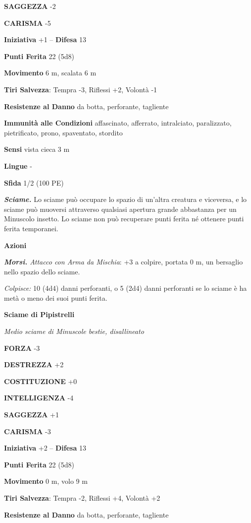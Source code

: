 \begin{multicols}{2}
\textbf{SAGGEZZA} -2

\textbf{CARISMA} -5

\textbf{Iniziativa} +1 -- \textbf{Difesa} 13

\textbf{Punti Ferita} 22 (5d8)

\textbf{Movimento} 6 m, scalata 6 m

\textbf{Tiri Salvezza}: Tempra -3, Riflessi +2, Volontà -1

\textbf{Resistenze al Danno} da botta, perforante, tagliente

\textbf{Immunità alle Condizioni} affascinato, afferrato, intralciato, paralizzato, pietrificato, prono, spaventato, stordito

\textbf{Sensi} vista cieca 3 m

\textbf{Lingue} -

\textbf{Sfida} 1/2 (100 PE)

\emph{\textbf{Sciame.}} Lo sciame può occupare lo spazio di un'altra creatura e viceversa, e lo sciame può muoversi attraverso qualsiasi apertura grande abbastanza per un Minuscolo insetto. Lo sciame non può recuperare punti ferita né ottenere punti ferita temporanei.

\textbf{Azioni}

\emph{\textbf{Morsi.} Attacco con Arma da Mischia}: +3 a colpire, portata 0 m, un bersaglio nello spazio dello sciame.

\emph{Colpisce:} 10 (4d4) danni perforanti, o 5 (2d4) danni perforanti se lo sciame è ha metà o meno dei suoi punti ferita.

\medskip\textbf{Sciame di Pipistrelli}

\emph{Medio sciame di Minuscole bestie, disallineato}

\textbf{FORZA} -3

\textbf{DESTREZZA} +2

\textbf{COSTITUZIONE} +0

\textbf{INTELLIGENZA} -4

\textbf{SAGGEZZA} +1

\textbf{CARISMA} -3

\textbf{Iniziativa} +2 -- \textbf{Difesa} 13

\textbf{Punti Ferita} 22 (5d8)

\textbf{Movimento} 0 m, volo 9 m

\textbf{Tiri Salvezza}: Tempra -2, Riflessi +4, Volontà +2

\textbf{Resistenze al Danno} da botta, perforante, tagliente


\end{multicols}
